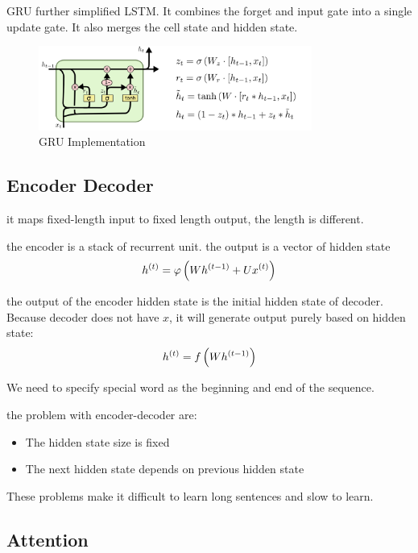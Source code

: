 \begin{definition}[GRU]
    GRU further simplified LSTM. It combines the forget and input gate into a single update gate. It also merges the cell state and hidden state.
\begin{figure}[H]
\includegraphics[width=0.8\textwidth]{pic/04/LSTM3-var-GRU.png}
\centering
\caption{GRU Implementation}
\end{figure}
\end{definition}



\subsection{Encoder Decoder}

it maps fixed-length input to fixed length output, the length is different.

the encoder is a stack of recurrent unit. the output is a vector of hidden state
\begin{equation}
    {h}^{(t)} = \varphi \left(W {h}^{(t-1)} + U {x}^{(t)} \right)
\end{equation}

the output of the encoder hidden state is the initial hidden state of decoder. Because decoder does not have $x$, it will generate output purely based on hidden state:
\begin{equation}
    {h}^{(t)} = f \left(W {h}^{(t-1)} \right)
\end{equation}

We need to specify special word as the beginning and end of the sequence.

the problem with encoder-decoder are:
\begin{itemize}
    \item The hidden state size is fixed
    \item The next hidden state depends on previous hidden state
\end{itemize}
These problems make it difficult to learn long sentences and slow to learn.


\subsection{Attention}

